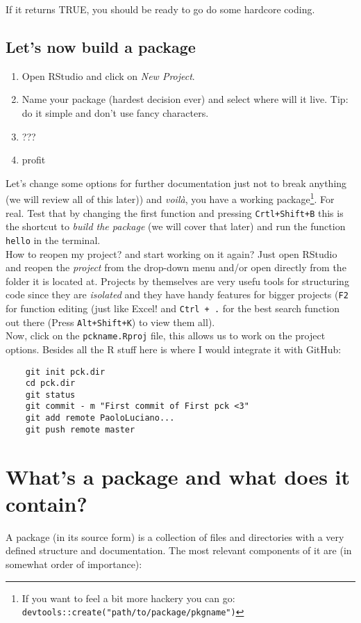 \documentclass[pdftex,11pt,a4paper]{article}
\begin{document}
If it returns TRUE, you should be ready to go do some hardcore coding. 

\subsection*{Let's now build a package}
\begin{enumerate}	
	\item Open RStudio and click on \textit{New Project}. 
	\item Name your package (hardest decision ever) and select where will it live. Tip: do it simple and don't use fancy characters.
	\item ???
	\item profit
\end{enumerate}

Let's change some options for further documentation just not to break anything (we will review all of this later)) and \textit{voilà}, you have a working package\footnote{If you want to feel a bit more hackery you can go: \texttt{devtools::create("path/to/package/pkgname")}}. For real. Test that by changing the first function and pressing \verb|Crtl+Shift+B| this is the shortcut to \textit{build the package} (we will cover that later) and run the function \verb|hello| in the terminal.\\

How to reopen my project? and start working on it again? Just open RStudio and reopen the \textit{project} from the drop-down menu and/or open directly from the folder it is located at. Projects by themselves are very usefu tools for structuring code since they are \textit{isolated} and they have handy features for bigger projects (\verb|F2| for function editing (just like Excel! and \verb|Ctrl + .| for the best search function out there (Press \verb|Alt+Shift+K|) to view them all).\\

Now, click on the \verb|pckname.Rproj| file, this allows us to work on the project options. Besides all the R stuff here is where I would integrate it with GitHub:
\begin{verbatim}
	git init pck.dir
	cd pck.dir
	git status
	git commit - m "First commit of First pck <3"
	git add remote PaoloLuciano...
	git push remote master
\end{verbatim}

\section*{What's a package and what does it contain?}
A package (in its source form) is a collection of files and directories with a very defined structure and documentation. The most relevant components of it are (in somewhat order of importance):
\end{document}
